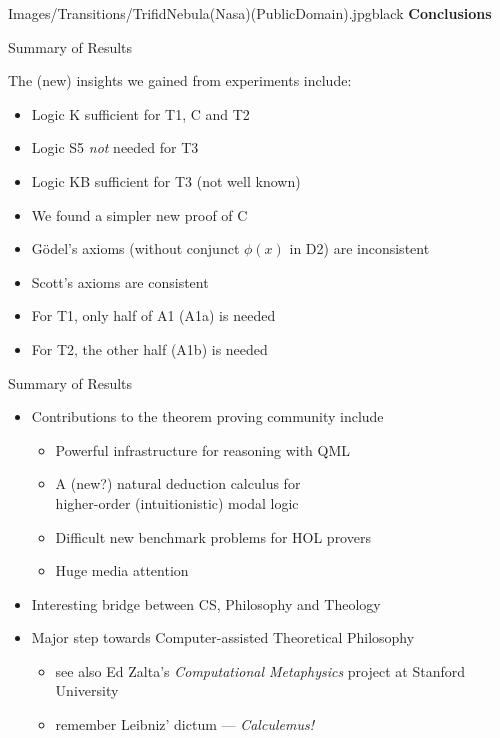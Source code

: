 
\begin{transitionframe}{Images/Transitions/TrifidNebula(Nasa)(PublicDomain).jpg}{black}
\textbf{Conclusions}
\end{transitionframe}



\begin{frame}{Summary of Results} \large

The (\alert{new}) insights we gained from experiments include:\\[.5em]
\begin{itemize}
\item Logic K sufficient for T1, C and T2 
\item Logic S5 \emph{not} needed for T3
\item \alert{Logic KB sufficient for T3 (not well known)}
\item \alert{We found a simpler new proof of C}
\item \alert{G\"odel's axioms (without conjunct $\phi(x)$ in D2) are inconsistent}
\item Scott's axioms are consistent
\item For T1, only half of A1 (A1a) is needed 
\item For T2, the other half (A1b) is needed
\end{itemize}
\end{frame}


\begin{frame}{Summary of Results} \large

\begin{itemize}
\item Contributions to the theorem proving community include \\[.5em]
\begin{itemize}
\item Powerful infrastructure for reasoning with QML
\item A (new?) natural deduction calculus for \\ higher-order (intuitionistic) modal logic
\item Difficult new benchmark problems for HOL provers
\item Huge media attention
\end{itemize}

\item Interesting bridge between CS, Philosophy and Theology

\item Major step towards \alert{Computer-assisted Theoretical Philosophy}
 \begin{itemize}
  \item see also Ed Zalta's \emph{Computational Metaphysics} project at Stanford University
  \item remember Leibniz' dictum --- \emph{Calculemus!}
  \end{itemize}
\end{itemize}
\end{frame}

